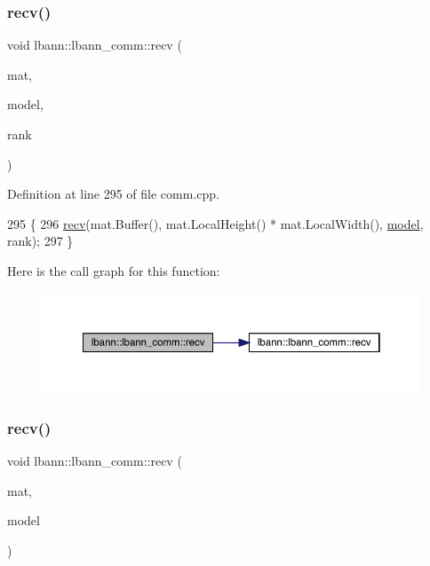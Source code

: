 \subsubsection{\texorpdfstring{recv()}{recv()}\hspace{0.1cm}{\footnotesize\ttfamily [4/9]}}
{\footnotesize\ttfamily void lbann\+::lbann\+\_\+comm\+::recv (\begin{DoxyParamCaption}\item[{\hyperlink{base_8hpp_a0fab5387556805cfeac3e7e567bf66c5}{Dist\+Mat} \&}]{mat,  }\item[{int}]{model,  }\item[{int}]{rank }\end{DoxyParamCaption})}



Definition at line 295 of file comm.\+cpp.


\begin{DoxyCode}
295                                                        \{
296   \hyperlink{classlbann_1_1lbann__comm_af8842cd4cea390f76d9146e1c4578de4}{recv}(mat.Buffer(), mat.LocalHeight() * mat.LocalWidth(), \hyperlink{namespacelbann_adee41f31f15f3906cbdcce4a1417eb56a20f35e630daf44dbfa4c3f68f5399d8c}{model}, rank);
297 \}
\end{DoxyCode}
Here is the call graph for this function\+:\nopagebreak
\begin{figure}[H]
\begin{center}
\leavevmode
\includegraphics[width=350pt]{classlbann_1_1lbann__comm_a1376b4f3c0941e19ff23a8baf30eb63d_cgraph}
\end{center}
\end{figure}
\mbox{\label{classlbann_1_1lbann__comm_a6b1ecfe900346c0996fb8066e4f76fe2}} 
\subsubsection{\texorpdfstring{recv()}{recv()}\hspace{0.1cm}{\footnotesize\ttfamily [5/9]}}
{\footnotesize\ttfamily void lbann\+::lbann\+\_\+comm\+::recv (\begin{DoxyParamCaption}\item[{\hyperlink{base_8hpp_a68f11fdc31b62516cb310831bbe54d73}{Mat} \&}]{mat,  }\item[{int}]{model }\end{DoxyParamCaption})\hspace{0.3cm}{\ttfamily [inline]}}



